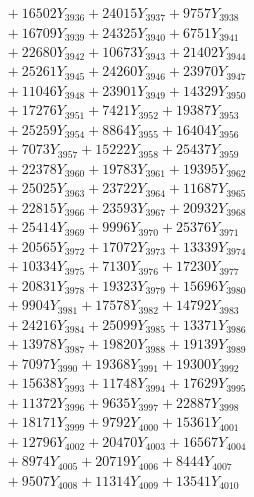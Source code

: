 \documentclass[a4paper,10pt]{article}
\begin{document}
{\begin{align}
&\;  + 16502 Y_{3936} + 24015 Y_{3937} + 9757 Y_{3938} \\[0.3ex]
&\;  + 16709 Y_{3939} + 24325 Y_{3940} + 6751 Y_{3941} \\[0.3ex]
&\;  + 22680 Y_{3942} + 10673 Y_{3943} + 21402 Y_{3944} \\[0.3ex]
&\;  + 25261 Y_{3945} + 24260 Y_{3946} + 23970 Y_{3947} \\[0.3ex]
&\;  + 11046 Y_{3948} + 23901 Y_{3949} + 14329 Y_{3950} \\[0.3ex]
&\;  + 17276 Y_{3951} + 7421 Y_{3952} + 19387 Y_{3953} \\[0.3ex]
&\;  + 25259 Y_{3954} + 8864 Y_{3955} + 16404 Y_{3956} \\[0.3ex]
&\;  + 7073 Y_{3957} + 15222 Y_{3958} + 25437 Y_{3959} \\[0.5ex]\allowbreak
&\;  + 22378 Y_{3960} + 19783 Y_{3961} + 19395 Y_{3962} \\[0.3ex]
&\;  + 25025 Y_{3963} + 23722 Y_{3964} + 11687 Y_{3965} \\[0.3ex]
&\;  + 22815 Y_{3966} + 23593 Y_{3967} + 20932 Y_{3968} \\[0.3ex]
&\;  + 25414 Y_{3969} + 9996 Y_{3970} + 25376 Y_{3971} \\[0.3ex]
&\;  + 20565 Y_{3972} + 17072 Y_{3973} + 13339 Y_{3974} \\[0.3ex]
&\;  + 10334 Y_{3975} + 7130 Y_{3976} + 17230 Y_{3977} \\[0.3ex]
&\;  + 20831 Y_{3978} + 19323 Y_{3979} + 15696 Y_{3980} \\[0.3ex]
&\;  + 9904 Y_{3981} + 17578 Y_{3982} + 14792 Y_{3983} \\[0.3ex]
&\;  + 24216 Y_{3984} + 25099 Y_{3985} + 13371 Y_{3986} \\[0.3ex]
&\;  + 13978 Y_{3987} + 19820 Y_{3988} + 19139 Y_{3989} \\[0.5ex]\allowbreak
&\;  + 7097 Y_{3990} + 19368 Y_{3991} + 19300 Y_{3992} \\[0.3ex]
&\;  + 15638 Y_{3993} + 11748 Y_{3994} + 17629 Y_{3995} \\[0.3ex]
&\;  + 11372 Y_{3996} + 9635 Y_{3997} + 22887 Y_{3998} \\[0.3ex]
&\;  + 18171 Y_{3999} + 9792 Y_{4000} + 15361 Y_{4001} \\[0.3ex]
&\;  + 12796 Y_{4002} + 20470 Y_{4003} + 16567 Y_{4004} \\[0.3ex]
&\;  + 8974 Y_{4005} + 20719 Y_{4006} + 8444 Y_{4007} \\[0.3ex]
&\;  + 9507 Y_{4008} + 11314 Y_{4009} + 13541 Y_{4010} \\[0.3ex]

\end{align}}
\end{document}
